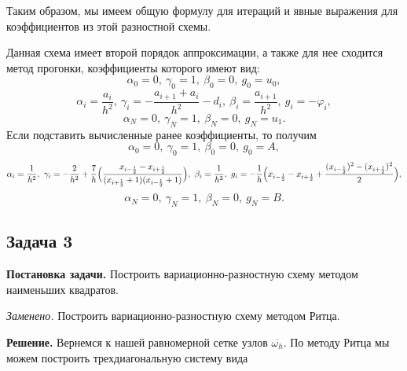 \documentclass[11pt]{article}
\begin{document}
Таким образом, мы имеем общую формулу для итераций и явные выражения для коэффициентов из этой разностной схемы. 

Данная схема имеет второй порядок аппроксимации, а также для нее сходится метод прогонки, коэффициенты которого имеют вид:
$$\alpha_0=0,\ \gamma_0=1,\ \beta_0=0,\ g_0=u_0,$$
$$\alpha_i=\frac{a_i}{h^2},\ \gamma_i=-\frac{a_{i+1}+a_{i}}{h^2}-d_i,\ \beta_i=\frac{a_{i+1}}{h^2},\ g_i=-\varphi_i,$$
$$\alpha_N=0,\ \gamma_N=1,\ \beta_N=0,\ g_N=u_1.$$
Если подставить вычисленные ранее коэффициенты, то получим
$$\alpha_0=0,\ \gamma_0=1,\ \beta_0=0,\ g_0=A,$$
$$\alpha_i=\frac{1}{h^2},\ \gamma_i=-\frac{2}{h^2}+\frac{7}{h}\Bigl(\frac{x_{i-\frac{1}{2}} - x_{i+\frac{1}{2}}}{(x_{i+\frac{1}{2}}+1)(x_{i-\frac{1}{2}}+1)} \Bigr),\ \beta_i=\frac{1}{h^2},\ g_i=-\frac{1}{h}\Bigl( x_{i-\frac{1}{2}}-x_{i+\frac{1}{2}}+\frac{(x_{i-\frac{1}{2}})^2-(x_{i+\frac{1}{2}})^2}{2} \Bigr),$$
$$\alpha_N=0,\ \gamma_N=1,\ \beta_N=0,\ g_N=B.$$
\newpage
\subsection*{Задача 3}
\textbf{Постановка задачи.} Построить вариационно-разностную схему методом наименьших квадратов.

\textit{Заменено.} Построить вариационно-разностную схему методом Ритца.

\textbf{Решение.} Вернемся к нашей равномерной сетке узлов $\overline{\omega_h}$. По методу Ритца мы можем построить трехдиагональную систему вида
\end{document}
